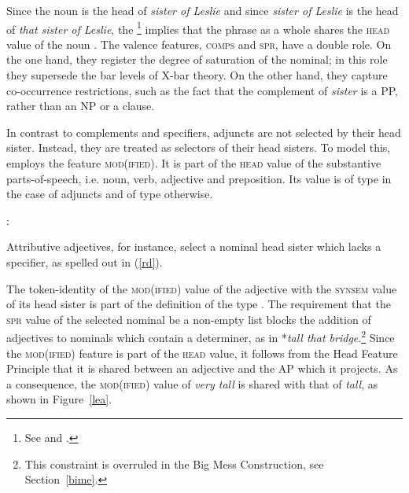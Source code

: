 \documentclass[output=paper
	        ,collection
	        ,collectionchapter
 	        ,biblatex
                ,babelshorthands
                ,newtxmath
                ,draftmode
                ,colorlinks, citecolor=brown
]{langscibook}
\begin{document}
Since the noun is the head of \emph{sister of Leslie} and since \emph{sister of Leslie} is 
the head of \emph{that sister of Leslie}, the \footnote{%
See \citet[34]{ps2} and .
} implies that the phrase as a whole shares the \textsc{head} value of the noun . 
The valence features, \textsc{comps} and \textsc{spr}, have a double role. 
On the one hand, they register the degree of saturation of the nominal; 
in this role they supersede the bar levels of X-bar theory. 
On the other hand, they capture co-occurrence restrictions, 
such as the fact that the complement of \emph{sister} is a PP, rather than an NP or a clause.

In contrast to complements and specifiers, adjuncts are not selected by their 
head sister. Instead, they are treated as selectors of their head sisters. 
To model this, \citet[55--57]{ps2} employs the feature \textsc{mod(ified)}. 
It is part of the \textsc{head} value of the substantive parts-of-speech, 
i.e. noun, verb, adjective and preposition. Its value is of type  
in the case of adjuncts and of type  otherwise.

\begin{exe} 
\ex   {}: 
\end{exe} 

\noindent
Attributive adjectives, for instance, select a nominal head sister 
which lacks a specifier, as spelled out in (\ref{rd}). 

\begin{exe} 
\ex\label{rd}
\end{exe}

\noindent
The token-identity of the \textsc{mod(ified)} value of the adjective
with the \textsc{synsem} value of its head sister is part of the 
definition of the type  . 
The requirement that the \textsc{spr} value of the selected nominal be a non-empty list
blocks the addition of adjectives to nominals which contain a 
determiner, as in *\emph{tall that bridge}.\footnote{This constraint is 
overruled in the Big Mess Construction, see Section~\ref{bime}.} 
Since the \textsc{mod(ified)} feature is part of the \textsc{head} value, 
it follows from the Head Feature Principle that it is shared between an adjective 
and the AP which it projects. As a consequence, the \textsc{mod(ified)} value of 
\emph{very tall} is shared with that of \emph{tall}, as shown in Figure~\ref{lea}. 
\end{document}
